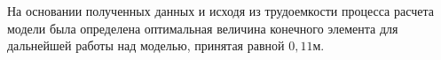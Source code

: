 \documentclass[12pt,a4paper,russian,emptystyle]{report}
\begin{document}
На основании полученных данных и исходя из трудоемкости процесса расчета модели была определена оптимальная величина конечного элемента для дальнейшей работы над моделью, принятая равной $0,11\text{м}$. 

%
%
%
%
%
%
%

%
%
%
%
%
%
%
%
%
%

\newpage
\listoftables
\listoffigures



\end{document}
